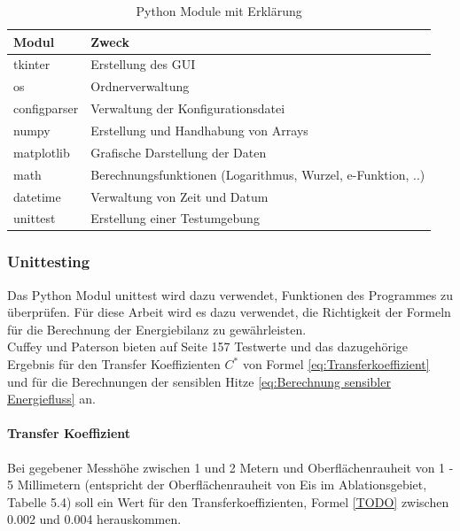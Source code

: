 \documentclass[12pt,a4paper]{article}
\begin{document}
\begin{table}[H]
\centering
{} 
\caption{Python Module mit Erklärung}
\label{tab:Python Module}
\begin{tabular}{|l|l|}
\hline
\textbf{Modul} & \textbf{Zweck}                                \\ \hline
tkinter             & Erstellung des GUI         \\
os             & Ordnerverwaltung         \\
configparser             & Verwaltung der Konfigurationsdatei         \\
numpy          & Erstellung und Handhabung von Arrays          \\
matplotlib     & Grafische Darstellung der Daten               \\
math		   & Berechnungsfunktionen (Logarithmus, Wurzel, e-Funktion, ..)   \\  
datetime		   & Verwaltung von Zeit und Datum   \\
unittest		   & Erstellung einer Testumgebung   \\  \hline


\end{tabular}
\end{table}
\vspace{0.3cm}

\subsubsection{Unittesting}
Das Python Modul unittest wird dazu verwendet, Funktionen des Programmes zu überprüfen. Für diese Arbeit wird es dazu verwendet, die Richtigkeit der Formeln für die Berechnung der Energiebilanz zu gewährleisten.\\

Cuffey und Paterson bieten auf Seite 157 Testwerte und das dazugehörige Ergebnis für den Transfer Koeffizienten $C^*$ von Formel \ref{eq:Transferkoeffizient} und für die Berechnungen der sensiblen Hitze \ref{eq:Berechnung sensibler Energiefluss} an.


\paragraph{Transfer Koeffizient}

Bei gegebener Messhöhe zwischen 1 und 2 Metern und Oberflächenrauheit von  1 - 5 Millimetern (entspricht der Oberflächenrauheit von Eis im Ablationsgebiet, Tabelle 5.4) soll ein Wert für den Transferkoeffizienten, Formel \ref{TODO} zwischen 0.002 und 0.004 herauskommen.\\
\end{document}
